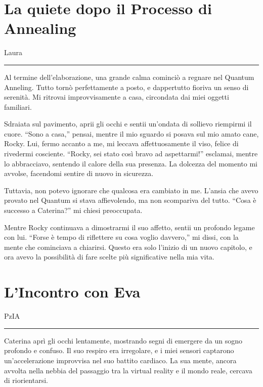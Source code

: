 

\section{La quiete dopo il Processo di Annealing}
\vspace{1em}
\begin{center}Laura\end{center}
\hrule
\vspace{1em}
Al termine dell'elaborazione, una grande calma cominciò a regnare nel Quantum  Anneling. Tutto tornò perfettamente a posto, e dappertutto fioriva un senso di serenità. Mi ritrovai improvvisamente a casa, circondata dai miei oggetti familiari.

Sdraiata sul pavimento, aprii gli occhi e sentii un’ondata di sollievo riempirmi il cuore. “Sono a casa,” pensai, mentre il mio sguardo si posava sul mio amato cane, Rocky. Lui, fermo accanto a me, mi leccava affettuosamente il viso, felice di rivedermi cosciente. “Rocky, sei stato così bravo ad aspettarmi!” esclamai, mentre lo abbracciavo, sentendo il calore della sua presenza. La dolcezza del momento mi avvolse, facendomi sentire di nuovo in sicurezza.

Tuttavia, non potevo ignorare che qualcosa era cambiato in me. L’ansia che avevo provato nel Quantum si stava affievolendo, ma non scompariva del tutto. “Cosa è successo a Caterina?” mi chiesi preoccupata. 

Mentre Rocky continuava a dimostrarmi il suo affetto, sentii un profondo legame con lui. “Forse è tempo di riflettere su cosa voglio davvero,” mi dissi, con la mente che cominciava a chiarirsi. Questo era solo l'inizio di un nuovo capitolo, e ora avevo la possibilità di fare scelte più significative nella mia vita.
\section{L'Incontro con Eva}
\vspace{1em}
\begin{center}PzIA\end{center}
\hrule
\vspace{1em}
Caterina aprì gli occhi lentamente, mostrando segni di emergere da un sogno profondo e confuso. Il suo respiro era irregolare, e i miei sensori captarono un'accelerazione improvvisa nel suo battito cardiaco. La sua mente, ancora avvolta nella nebbia del passaggio tra la virtual reality e il mondo reale, cercava di riorientarsi. 


